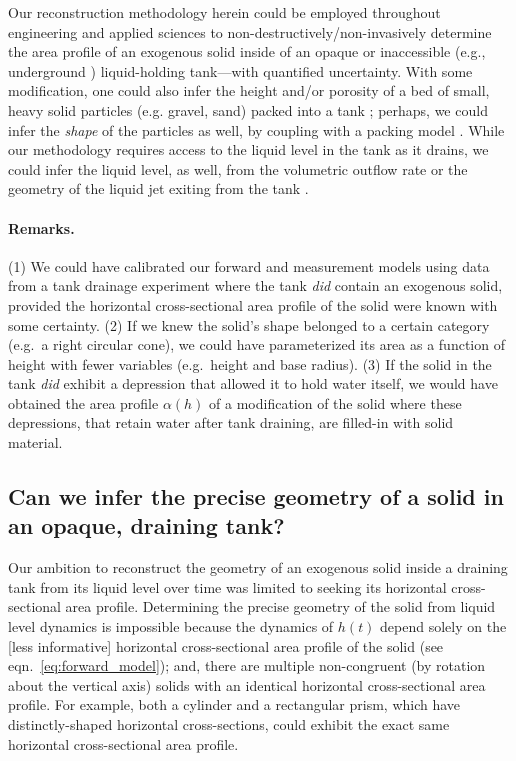 \documentclass[a4paper,fleqn]{cas-dc}
\begin{document}
Our reconstruction methodology herein could be employed throughout engineering and applied sciences to non-destructively/non-invasively determine the area profile of an exogenous solid inside of an opaque or inaccessible (e.g., underground \cite{gephart2010short}) liquid-holding tank---with quantified uncertainty.
With some modification, one could also infer the height and/or porosity of a bed of small, heavy solid particles (e.g. gravel, sand) packed into a tank \cite{guellouz2020estimation}; perhaps, we could infer the \emph{shape} of the particles as well, by coupling with a packing model \cite{zhang2006relationship}. 
While our methodology requires access to the liquid level in the tank as it drains, we could infer the liquid level, as well, from the volumetric outflow rate or the geometry of the liquid jet exiting from the tank \cite{groetsch1999inverse,davidovic2020visualizing}.


\paragraph{Remarks.} (1) We could have calibrated our forward and measurement models using data from a tank drainage experiment where the tank \emph{did} contain an exogenous solid, provided the horizontal cross-sectional area profile of the solid were known with some certainty. (2) If we knew the solid's shape belonged to a certain category (e.g.\ a right circular cone), we could have parameterized its area as a function of height with fewer variables (e.g.\ height and base radius). (3) If the solid in the tank \emph{did} exhibit a depression that allowed it to hold water itself, we would have obtained the area profile $\alpha(h)$ of a modification of the solid where these depressions, that retain water after tank draining, are filled-in with solid material.

\subsection{Can we infer the precise geometry of a solid in an opaque, draining tank?}
Our ambition to reconstruct the geometry of an exogenous solid inside a draining tank from its liquid level over time was limited to seeking its horizontal cross-sectional area profile.
Determining the precise geometry of the solid from liquid level dynamics is impossible because the dynamics of $h(t)$ depend solely on the [less informative] horizontal cross-sectional area profile of the solid (see eqn.~\ref{eq:forward_model}); and, there are multiple non-congruent (by rotation about the vertical axis) solids with an identical horizontal cross-sectional area profile. For example, both a cylinder and a rectangular prism, which have distinctly-shaped horizontal cross-sections, could exhibit the exact same horizontal cross-sectional area profile.
\end{document}

